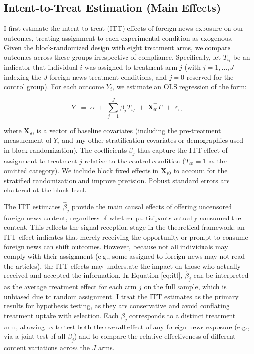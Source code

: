 \documentclass[12pt, american]{article}
\begin{document}
\subsection{Intent-to-Treat Estimation (Main Effects)}
I first estimate the intent-to-treat (ITT) effects of foreign news exposure on our outcomes, treating assignment to each experimental condition as exogenous. Given the block-randomized design with eight treatment arms, we compare outcomes across these groups irrespective of compliance. Specifically, let $T_{ij}$ be an indicator that individual $i$ was assigned to treatment arm $j$ (with $j=1,\dots,J$ indexing the $J$ foreign news treatment conditions, and $j=0$ reserved for the control group). For each outcome $Y_{i}$, we estimate an OLS regression of the form: 

\begin{equation}\label{eq:itt}
Y_{i} \;=\; \alpha \;+\; \sum_{j=1}^{J} \beta_{j}\,T_{ij} \;+\; \mathbf{X}_{i0}^{\top}\Gamma \;+\; \varepsilon_{i}\,,
\end{equation}

where $\mathbf{X}_{i0}$ is a vector of baseline covariates (including the pre-treatment measurement of $Y_{i}$ and any other stratification covariates or demographics used in block randomization). The coefficients $\beta_{j}$ thus capture the ITT effect of assignment to treatment $j$ relative to the control condition ($T_{i0}=1$ as the omitted category). We include block fixed effects in $\mathbf{X}_{i0}$ to account for the stratified randomization and improve precision. Robust standard errors are clustered at the  block level.

The ITT estimates $\hat{\beta}_{j}$ provide the main causal effects of offering uncensored foreign news content, regardless of whether participants actually consumed the content. This reflects the signal reception stage in the theoretical framework: an ITT effect indicates that merely receiving the opportunity or prompt to consume foreign news can shift outcomes. However, because not all individuals may comply with their assignment (e.g., some assigned to foreign news may not read the articles), the ITT effects may understate the impact on those who actually received and accepted the information. In Equation \eqref{eq:itt}, $\hat{\beta}_{j}$ can be interpreted as the average treatment effect for each arm $j$ on the full sample, which is unbiased due to random assignment. I treat the ITT estimates as the primary results for hypothesis testing, as they are conservative and avoid conflating treatment uptake with selection. Each $\beta_{j}$ corresponds to a distinct treatment arm, allowing us to test both the overall effect of any foreign news exposure (e.g., via a joint test of all $\beta_{j}$) and to compare the relative effectiveness of different content variations across the $J$ arms.
\end{document}
